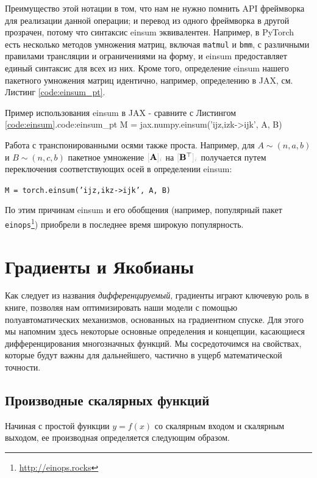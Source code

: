 Преимущество этой нотации в том, что нам не нужно помнить API фреймворка для реализации данной операции; и перевод из одного фреймворка в другой прозрачен, потому что синтаксис einsum эквивалентен. Например, в PyTorch есть несколько методов умножения матриц, включая {\footnotesize\verb+matmul+} и {\footnotesize\verb+bmm+}, с различными правилами трансляции и ограничениями на форму, и einsum предоставляет единый синтаксис для всех из них. Кроме того, определение einsum нашего пакетного умножения матриц идентично, например, определению в JAX, см. Листинг \ref{code:einsum_pt}.

\begin{mypy}{Пример использования einsum в JAX - сравните с Листингом \ref{code:einsum}.}{code:einsum_pt}
M = jax.numpy.einsum('ijz,izk->ijk', A, B)
\end{mypy}
%
Работа с транспонированными осями также проста. Например, для $A \sim (n,a,b)$ и $B \sim (n, c, b)$ пакетное умножение $\idx{\mathbf{A}}{i}$ на $\idx{\mathbf{B}^\top}{i}$ получается путем переключения соответствующих осей в определении einsum:

{\footnotesize
\noindent\texttt{M = torch.einsum('ijz,ikz->ijk', A, B)}
}

\noindent По этим причинам einsum и его обобщения (например, популярный пакет {\footnotesize\verb+einops+}\footnote{\url{http://einops.rocks}}) приобрели в последнее время широкую популярность.

\section{Градиенты и Якобианы}
\label{sec:gradients_and_jacobians}

Как следует из названия \textit{дифференцируемый}, градиенты играют ключевую роль в книге, позволяя нам оптимизировать наши модели с помощью полуавтоматических механизмов, основанных на градиентном спуске. Для этого мы напомним здесь некоторые основные определения и концепции, касающиеся дифференцирования многозначных функций. Мы сосредоточимся на свойствах, которые будут важны для дальнейшего, частично в ущерб математической точности.

\subsection{Производные скалярных функций}

Начиная с простой функции $y=f(x)$ со скалярным входом и скалярным выходом, ее производная определяется следующим образом.

